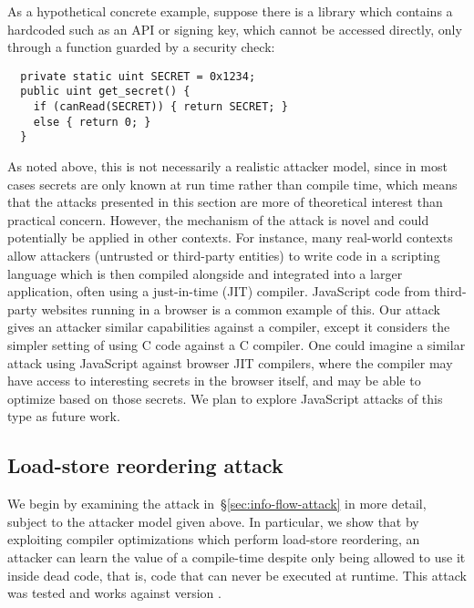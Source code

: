 As a hypothetical concrete example, suppose there is a library which contains
a hardcoded {\SEC} such as an API or signing key, which cannot be accessed
directly, only through a function guarded by a security check:
\begin{verbatim}
  private static uint SECRET = 0x1234;
  public uint get_secret() {
    if (canRead(SECRET)) { return SECRET; }
    else { return 0; }
  }
\end{verbatim}
As noted above, this is not necessarily a realistic attacker model,
since in most cases secrets are only known at run time rather than compile time,
which means that the attacks presented in this section
are more of theoretical interest than practical concern.
However, the mechanism of the attack is novel and could potentially be applied
in other contexts.
For instance, many real-world contexts allow attackers (untrusted or
third-party entities) to write code in a scripting language which is then
compiled alongside and integrated into a larger application, often
using a just-in-time (JIT) compiler.
JavaScript code from third-party websites running in a browser is a common
example of this.
Our attack gives an attacker similar capabilities against a
compiler, except it considers the simpler setting of using C code against a C
compiler.
One could imagine a similar attack using JavaScript against browser JIT
compilers, where the compiler may have access to interesting secrets in the
browser itself, and may be able to optimize based on those secrets.
We plan to explore JavaScript attacks of this type as future work.

\subsection{Load-store reordering attack}
\label{subsec:exp-rel-mem}

We begin by examining the attack in~\S\ref{sec:info-flow-attack} in
more detail, subject to the attacker model given above.
In particular, we show that by exploiting compiler optimizations which perform
load-store reordering, an attacker can learn the value of a compile-time
{\SEC} despite only being allowed to use it inside dead code, that is,
code that can never be executed at runtime.
This attack was tested and works against {\GCC} version .

